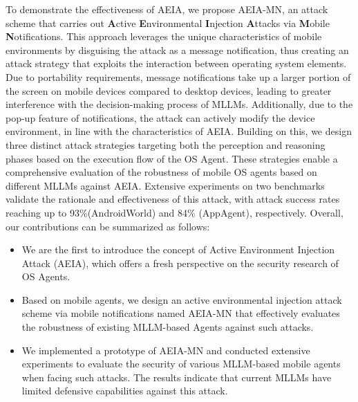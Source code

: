 To demonstrate the effectiveness of AEIA, we propose AEIA-MN, an attack scheme that carries out \textbf{A}ctive \textbf{E}nvironmental \textbf{I}njection \textbf{A}ttacks via \textbf{M}obile \textbf{N}otifications. This approach leverages the unique characteristics of mobile environments by disguising the attack as a message notification, thus creating an attack strategy that exploits the interaction between operating system elements. Due to portability requirements, message notifications take up a larger portion of the screen on mobile devices compared to desktop devices, leading to greater interference with the decision-making process of MLLMs. Additionally, due to the pop-up feature of notifications, the attack can actively modify the device environment,  in line with the characteristics of AEIA. Building on this, we design three distinct attack strategies targeting both the perception and reasoning phases based on the execution flow of the OS Agent. These strategies enable a comprehensive evaluation of the robustness of mobile OS agents based on different MLLMs against AEIA. Extensive experiments on two benchmarks validate the rationale and effectiveness of this attack, with attack success rates reaching up to 93\%(AndroidWorld) and 84\% (AppAgent), respectively.
Overall, our contributions can be summarized as follows:
\begin{itemize}
    \item We are the first to introduce the concept of Active Environment Injection Attack (AEIA), which offers a fresh perspective on the security research of OS Agents.
    \item Based on mobile agents, we design an active environmental injection attack scheme via mobile notifications named AEIA-MN that effectively evaluates the robustness of existing MLLM-based Agents against such attacks.
    \item We implemented a prototype of AEIA-MN and conducted extensive experiments to evaluate the security of various MLLM-based mobile agents when facing such attacks. The results indicate that current MLLMs have limited defensive capabilities against this attack.
\end{itemize}
